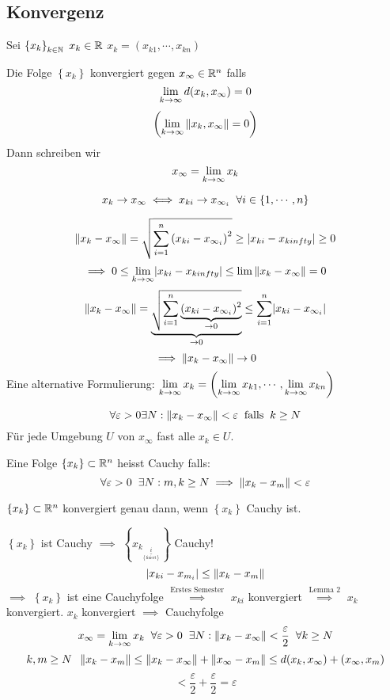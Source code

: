 \subsection{Konvergenz}
Sei $\left\{ x_k \right\}_{k\in\mathbb{N}}$ $x_k\in\mathbb{R}$ $x_k=\left( x_{k1}, \cdots, x_{kn} \right)$
\begin{Def}
  Die Folge $\left\{ x_k \right\}$ konvergiert gegen $x_\infty\in\mathbb{R}^n$ falls
  \[\displaystyle\lim_{k\rightarrow\infty}d(x_k,x_\infty)=0\]
  \[\left( \displaystyle\lim_{k\rightarrow\infty}\left\| x_k,x_\infty \right\|=0 \right)\]
  Dann schreiben wir
  \[x_\infty=\displaystyle\lim_{k\rightarrow\infty}x_k\]
\end{Def}
\begin{Sat}
  \[x_k\to x_\infty\iff x_{ki}\to x_{\infty_i}\hspace{2mm}\forall i\in\left\{ 1,\cdots,n \right\}\]
\end{Sat}
\begin{Bew}
  \[\left\| x_k - x_\infty \right\|=\sqrt{\sum_{i=1}^n\left( x_{ki}-x_{\infty_i} \right)^2}\geq \mathopen| x_{ki}-x_{kinfty} \mathclose|\geq 0\]
  \[\implies 0\leq \displaystyle\lim_{k\rightarrow\infty}\mathopen| x_{ki}-x_{kinfty} \mathclose|\leq \lim\left\| x_k-x_\infty \right\|=0\]
  \[\left\| x_k-x_\infty \right\|=\underbrace{\sqrt{\sum_{i=1}^n\underbrace{(x_{ki}-x_{\infty_i})^2}_{\to 0}}}_{\to 0}\leq \sum_{i=1}^n\mathopen| x_{ki}-x_{\infty_i} \mathclose|\]
  \[\implies \left\| x_k-x_\infty \right\|\to 0\]
  Eine alternative Formulierung: $\displaystyle\lim_{k\rightarrow\infty}x_k=\left( \displaystyle\lim_{k\rightarrow\infty} x_{k1},\cdots,\displaystyle\lim_{k\rightarrow\infty} x_{kn} \right)$
\end{Bew}
\begin{Bem}
  \[\forall \varepsilon>0 \exists N: \left\| x_k-x_\infty \right\|<\varepsilon\hspace{2mm}\text{falls}\hspace{2mm} k\geq N\]
  Für jede Umgebung $U$ von $x_\infty$ fast alle $x_k\in U$.
\end{Bem}
\begin{Def}
  Eine Folge $\left\{ x_k \right\}\subset\mathbb{R}^n$ heisst Cauchy falls:
  \[\forall \varepsilon>0\hspace{2mm}\exists N: m,k\geq N\implies \left\| x_k-x_m \right\|<\varepsilon\]
\end{Def}
\begin{Lem}
  $\left\{ x_k \right\}\subset\mathbb{R}^n$ konvergiert genau dann, wenn $\left\{ x_k \right\}$ Cauchy ist.
\end{Lem}
\begin{Bew}
  $\left\{ x_k \right\}$ ist Cauchy $\implies$ $\left\{ x_{k_{\underbrace{i}_{\left\{ \text{fixiert} \right\}}}} \right\}$ Cauchy!
  \[\mathopen| x_{ki}-x_{m_i} \mathclose|\leq\left\| x_k-x_m \right\|\]
  $\implies$ $\left\{ x_k \right\}$ ist eine Cauchyfolge $\stackrel{\text{Erstes Semester}}{\implies}$ $x_{ki}$ konvergiert $\stackrel{\text{Lemma 2}}{\implies}$ $x_k$ konvergiert. $x_k$ konvergiert $\implies$ Cauchyfolge
  \[x_\infty=\displaystyle\lim_{k\rightarrow\infty} x_k\hspace{2mm}\forall \varepsilon>0\hspace{2mm}\exists N:\left\| x_k-x_\infty \right\|<\frac{\varepsilon}{2}\hspace{2mm}\forall k\geq N\]
  \[k,m\geq N\hspace{2mm} \left\| x_k-x_m \right\|\leq \left\| x_k-x_\infty \right\|+\left\| x_\infty-x_m \right\|\leq d(x_k,x_\infty)+(x_\infty,x_m)\]
  \[<\frac{\varepsilon}{2}+\frac{\varepsilon}{2}=\varepsilon\]
\end{Bew}
